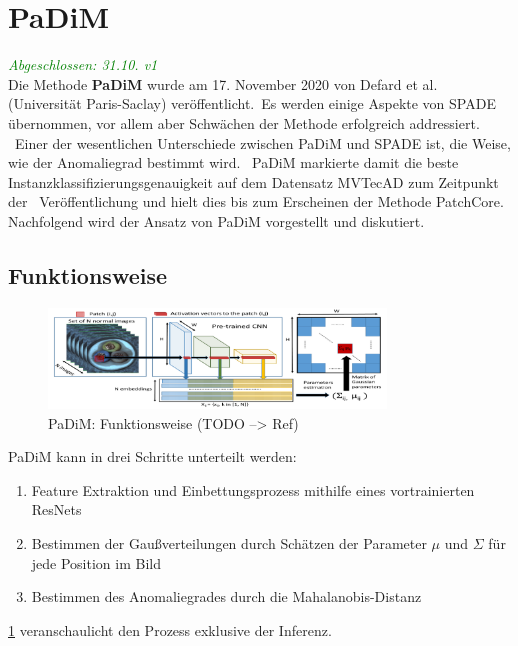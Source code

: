 \section{PaDiM}\label{sec:PaDiM}
\textcolor{green}{\textit{Abgeschlossen: 31.10. v1}}\\
Die Methode \textbf{PaDiM} wurde am 17. November 2020 von Defard et al. (Universität Paris-Saclay) veröffentlicht.\
Es werden einige Aspekte von SPADE übernommen, vor allem aber Schwächen der Methode erfolgreich addressiert. \ 
Einer der wesentlichen Unterschiede zwischen PaDiM und SPADE ist, die Weise, wie der Anomaliegrad bestimmt wird. \ 
PaDiM markierte damit die beste Instanzklassifizierungsgenauigkeit auf dem Datensatz MVTecAD zum Zeitpunkt der \ 
Veröffentlichung und hielt dies bis zum Erscheinen der Methode \glqq PatchCore\grqq{}.\cite{paperswithcode}
Nachfolgend wird der Ansatz von PaDiM vorgestellt und diskutiert.\
\subsection{Funktionsweise}\label{subsec:PaDiMFunktionsweise}
\begin{figure}[H]
  \centering
  \includegraphics[width=0.8\textwidth]{bilder/padim.png}
  \caption{PaDiM: Funktionsweise (TODO --> Ref)}
  \label{fig:PaDiMOverview}
\end{figure}
PaDiM kann in drei Schritte unterteilt werden: \
\begin{enumerate}
  \item Feature Extraktion und Einbettungsprozess mithilfe eines vortrainierten ResNets
  \item Bestimmen der Gaußverteilungen durch Schätzen der Parameter $\mu$ und $\Sigma$ für jede Position im Bild
  \item Bestimmen des Anomaliegrades durch die Mahalanobis-Distanz
\end{enumerate}
\ref{fig:PaDiMOverview} veranschaulicht den Prozess exklusive der Inferenz. \
